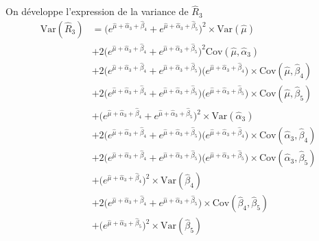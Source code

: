 \documentclass[11pt,french]{report}
\begin{document}
On développe l'expression de la variance de $\widehat{R}_3$
\begin{align*}
\text{Var}(\widehat{R}_3) & = \Bigg(  e^{\widehat{\mu} + \widehat{\alpha}_3 + \widehat{\beta}_4} +  e^{\widehat{\mu} + \widehat{\alpha}_3 + \widehat{\beta}_5}\Bigg)^2 \times \text{Var}(\widehat{\mu}) \\
& + 2 \Bigg( e^{\widehat{\mu} + \widehat{\alpha}_3 + \widehat{\beta}_4} +  e^{\widehat{\mu} + \widehat{\alpha}_3 + \widehat{\beta}_5} \Bigg)^2 \text{Cov}(\widehat{\mu}, \widehat{\alpha}_3) \\
& + 2 \Bigg( e^{\widehat{\mu} + \widehat{\alpha}_3 + \widehat{\beta}_4} +  e^{\widehat{\mu} + \widehat{\alpha}_3 + \widehat{\beta}_5} \Bigg) \Bigg( e^{\widehat{\mu} + \widehat{\alpha}_3 + \widehat{\beta}_4} \Bigg)  \times \text{Cov}(\widehat{\mu}, \widehat{\beta}_4) \\
& + 2 \Bigg( e^{\widehat{\mu} + \widehat{\alpha}_3 + \widehat{\beta}_4} +  e^{\widehat{\mu} + \widehat{\alpha}_3 + \widehat{\beta}_5} \Bigg) \Bigg( e^{\widehat{\mu} + \widehat{\alpha}_3 + \widehat{\beta}_5} \Bigg)  \times \text{Cov}(\widehat{\mu}, \widehat{\beta}_5) \\
& + \Bigg( e^{\widehat{\mu} + \widehat{\alpha}_3 + \widehat{\beta}_4} + e^{\widehat{\mu} + \widehat{\alpha}_3 + \widehat{\beta}_5}  \Bigg)^2 \times \text{Var}(\widehat{\alpha}_3)\\
& + 2 \Bigg( e^{\widehat{\mu} + \widehat{\alpha}_3 + \widehat{\beta}_4} +  e^{\widehat{\mu} + \widehat{\alpha}_3 + \widehat{\beta}_5} \Bigg) \Bigg( e^{\widehat{\mu} + \widehat{\alpha}_3 + \widehat{\beta}_4} \Bigg)  \times \text{Cov}(\widehat{\alpha}_3, \widehat{\beta}_4) \\
& + 2 \Bigg( e^{\widehat{\mu} + \widehat{\alpha}_3 + \widehat{\beta}_4} +  e^{\widehat{\mu} + \widehat{\alpha}_3 + \widehat{\beta}_5} \Bigg) \Bigg( e^{\widehat{\mu} + \widehat{\alpha}_3 + \widehat{\beta}_5} \Bigg)  \times \text{Cov}(\widehat{\alpha}_3, \widehat{\beta}_5) \\
& + \Bigg( e^{\widehat{\mu} + \widehat{\alpha}_3 + \widehat{\beta}_4}  \Bigg)^2 \times \text{Var}(\widehat{\beta}_4)\\
& + 2 \Bigg( e^{\widehat{\mu} + \widehat{\alpha}_3 + \widehat{\beta}_4} +  e^{\widehat{\mu} + \widehat{\alpha}_3 + \widehat{\beta}_5} \Bigg) \times \text{Cov}(\widehat{\beta}_4, \widehat{\beta}_5)\\
& + \Bigg( e^{\widehat{\mu} + \widehat{\alpha}_3 + \widehat{\beta}_5}  \Bigg)^2 \times \text{Var}(\widehat{\beta}_5)
\end{align*}
\end{document}
